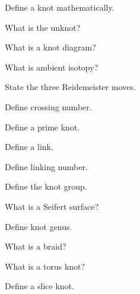 \begin{exercise}[1]
Define a knot mathematically.
\end{exercise}

\begin{exercise}[1]
What is the unknot?
\end{exercise}

\begin{exercise}[1]
What is a knot diagram?
\end{exercise}

\begin{exercise}[1]
What is ambient isotopy?
\end{exercise}

\begin{exercise}[1]
State the three Reidemeister moves.
\end{exercise}

\begin{exercise}[1]
Define crossing number.
\end{exercise}

\begin{exercise}[1]
Define a prime knot.
\end{exercise}

\begin{exercise}[1]
Define a link.
\end{exercise}

\begin{exercise}[1]
Define linking number.
\end{exercise}

\begin{exercise}[1]
Define the knot group.
\end{exercise}

\begin{exercise}[1]
What is a Seifert surface?
\end{exercise}

\begin{exercise}[1]
Define knot genus.
\end{exercise}

\begin{exercise}[1]
What is a braid?
\end{exercise}

\begin{exercise}[1]
What is a torus knot?
\end{exercise}

\begin{exercise}[1]
Define a slice knot.
\end{exercise}

